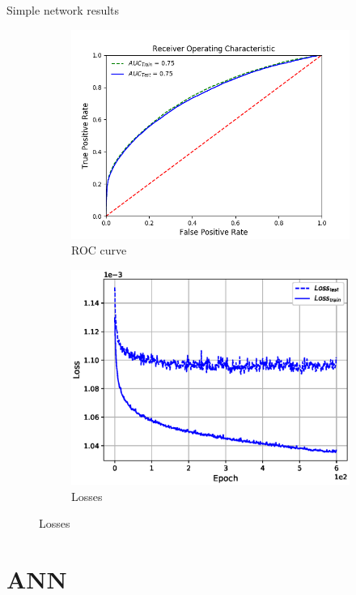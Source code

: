 \documentclass[10pt, UKenglish]{beamer}
\begin{document}
\begin{frame}{Simple network results}
\begin{figure}[htbp]
    \begin{subfigure}[b]{0.4\textwidth}
		\includegraphics[width=\textwidth]{standard_ROC}
		\caption{ROC curve}
		\label{fig:simple:final:roc}
	\end{subfigure}
\quad
	\begin{subfigure}[b]{0.4\textwidth}
		\includegraphics[width=\textwidth]{standard_losses}
		\caption{Losses}
		\label{fig:simple:final:loss}
	\end{subfigure}
\end{figure}
\end{frame}

\section{ANN}
\end{document}
